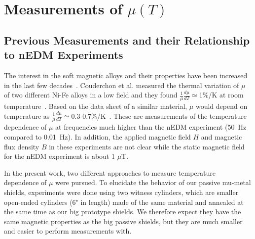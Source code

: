 \documentclass[review]{elsarticle}
\begin{document}
\section{Measurements of $\mu(T)$}

\subsection{Previous Measurements and their Relationship to nEDM Experiments}
The interest in the soft magnetic alloys and their properties have been increased in the last few decades~\cite{bib:pfeifer,bib:bozorth,bib:couderchon}. Couderchon et al. measured the thermal variation of $\mu$ of two different Ni-Fe alloys in a low field and they found
$\frac{1}{\mu}\frac{d \mu}{dT}\simeq$1\%/K at room
temperature~\cite{bib:couderchon}. Based on the data sheet of a
similar material, $\mu$ would depend on temperature as
$\frac{1}{\mu}\frac{d\mu}{dT}\simeq$0.3-0.7\%/K~\cite{bib:kruppvdm}. These
are measurements of the temperature dependence of $\mu$ at frequencies
much higher than the nEDM experiment (50~Hz compared to 0.01~Hz). In
addition, the applied magnetic field $H$ and magnetic flux density $B$
in these experiments are not clear while the static magnetic field for
the nEDM experiment is about 1 $\mu$T.


In the present work, two different approaches to measure temperature
dependence of $\mu$ were pursued. To elucidate the behavior of our
passive mu-metal shields, experiments were done using two witness
cylinders, which are smaller open-ended cylinders (6" in length) made
of the same material and annealed at the same time as our big
prototype shields. We therefore expect they have the same magnetic
properties as the big passive shields, but they are much smaller and
easier to perform measurements with.
\end{document}
